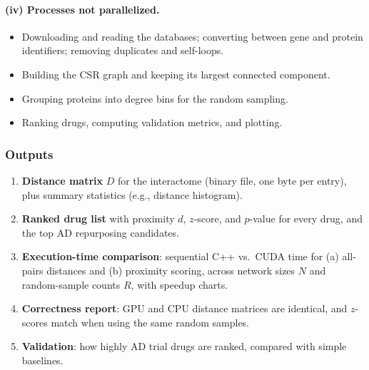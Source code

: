 \paragraph{(iv) Processes not parallelized.}
\begin{itemize}[nosep]
  \item Downloading and reading the databases; converting between gene and protein identifiers; removing duplicates and self-loops.
  \item Building the CSR graph and keeping its largest connected component.
  \item Grouping proteins into degree bins for the random sampling.
  \item Ranking drugs, computing validation metrics, and plotting.
\end{itemize}

\subsubsection{Outputs}

\begin{enumerate}
  \item \textbf{Distance matrix} $D$ for the interactome (binary file, one byte per entry), plus summary statistics (e.g., distance histogram).
  \item \textbf{Ranked drug list} with proximity $d$, $z$-score, and $p$-value for every drug, and the top AD repurposing candidates.
  \item \textbf{Execution-time comparison}: sequential C++ vs.\ CUDA time for (a) all-pairs distances and (b) proximity scoring, across network sizes $N$ and random-sample counts $R$, with speedup charts.
  \item \textbf{Correctness report}: GPU and CPU distance matrices are identical, and $z$-scores match when using the same random samples.
  \item \textbf{Validation}: how highly AD trial drugs are ranked, compared with simple baselines.
\end{enumerate}

